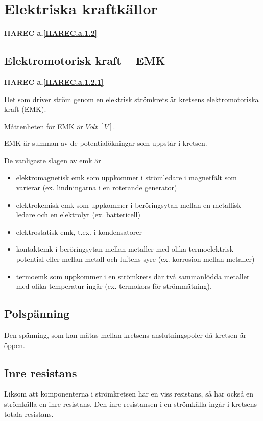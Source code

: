 \section{Elektriska kraftkällor}
\textbf{HAREC a.\ref{HAREC.a.1.2}\label{myHAREC.a.1.2}}

\subsection{Elektromotorisk kraft -- EMK}
\textbf{HAREC a.\ref{HAREC.a.1.2.1}\label{myHAREC.a.1.2.1}}

Det som driver ström genom en elektrisk strömkrets är kretsens elektromotoriska
kraft (EMK).

Måttenheten för EMK är \(Volt\ [V]\).

EMK är summan av de potentialökningar som uppstår i kretsen.

De vanligaste slagen av emk är
\begin{itemize}
\item elektromagnetisk emk som uppkommer i strömledare i magnetfält som
varierar (ex. lindningarna i en roterande generator)
\item elektrokemisk emk som uppkommer i beröringsytan mellan en metallisk
ledare och en elektrolyt (ex. battericell)
\item elektrostatisk emk, t.ex. i kondensatorer
\item kontaktemk i beröringsytan mellan metaller med olika termoelektrisk
potential eller mellan metall och luftens syre (ex. korrosion mellan metaller)
\item termoemk som uppkommer i en strömkrets där två sammanlödda metaller med
olika temperatur ingår (ex. termokors för strömmätning).
\end{itemize}

\subsection{Polspänning}

Den spänning, som kan mätas mellan kretsens anslutningspoler då kretsen är öppen.

\subsection{Inre resistans}

Liksom att komponenterna i strömkretsen har en viss resistans, så har också en
strömkälla en inre resistans.
Den inre resistansen i en strömkälla ingår i kretsens totala resistans.

